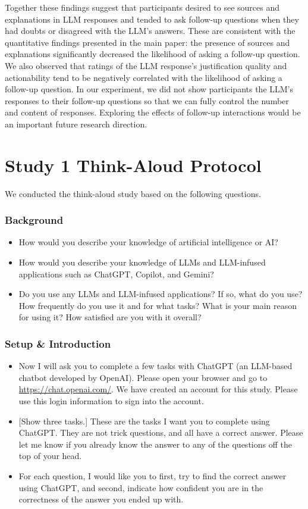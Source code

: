 Together these findings suggest that participants desired to see sources and explanations in LLM responses and tended to ask follow-up questions when they had doubts or disagreed with the LLM's answers. These are consistent with the quantitative findings presented in the main paper: the presence of sources and explanations significantly decreased the likelihood of asking a follow-up question. We also observed that ratings of the LLM response's justification quality and actionability tend to be negatively correlated with the likelihood of asking a follow-up question. 
In our experiment, we did not show participants the LLM's responses to their follow-up questions so that we can fully control the number and content of responses.
Exploring the effects of follow-up interactions would be an important future research direction. 




\section{Study 1 Think-Aloud Protocol}
\label{app:study1protocol}

We conducted the think-aloud study based on the following questions.

\subsubsection*{Background}
\begin{itemize}
    \item How would you describe your knowledge of artificial intelligence or AI?
    \item How would you describe your knowledge of LLMs and LLM-infused applications such as ChatGPT, Copilot, and Gemini? 
    \item Do you use any LLMs and LLM-infused applications? If so, what do you use? How frequently do you use it and for what tasks?  What is your main reason for using it? How satisfied are you with it overall?
\end{itemize}

\subsubsection*{Setup \& Introduction}
\begin{itemize}
    \item Now I will ask you to complete a few tasks with ChatGPT (an LLM-based chatbot developed by OpenAI). Please open your browser and go to \url{https://chat.openai.com/}. We have created an account for this study. Please use this login information to sign into the account. 
    \item {[}Show three tasks.{]} These are the tasks I want you to complete using ChatGPT. They are not trick questions, and all have a correct answer. Please let me know if you already know the answer to any of the questions off the top of your head.
    \item For each question, I would like you to first, try to find the correct answer using ChatGPT, and second, indicate how confident you are in the correctness of the answer you ended up with. 
\end{itemize}

